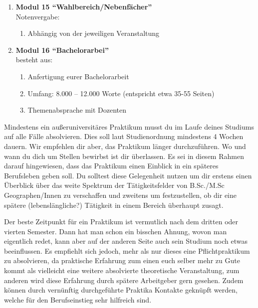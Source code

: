 \begin{enumerate}
 \item \textbf{Modul 15 ``Wahlbereich/Nebenfächer''}  \\
  Notenvergabe:
   \begin{enumerate}
    \item[] Abhängig von der jeweiligen Veranstaltung
   \end{enumerate}
 
 \item \textbf{Modul 16 ``Bachelorarbei''}  \\ besteht aus:
  \begin{enumerate}
   \item Anfertigung eurer Bachelorarbeit 
   \item Umfang: 8.000 – 12.000 Worte (entspricht etwa 35-55 Seiten)
   \item Themenabsprache mit Dozenten
  \end{enumerate}




\end{enumerate}

\newpage

Mindestens ein außeruniversitäres Praktikum musst du im Laufe deines Studiums auf alle Fälle absolvieren. Dies soll laut Studienordnung mindestens 4 Wochen dauern. Wir empfehlen dir aber, das Praktikum länger durchzuführen. Wo und wann du dich um Stellen bewirbst ist dir überlassen. Es sei in diesem Rahmen darauf hingewiesen, dass das Praktikum einen Einblick in ein späteres Berufsleben geben soll. Du solltest diese Gelegenheit nutzen um dir erstens einen Überblick über das weite Spektrum der Tätigkeitsfelder von B.Sc./M.Sc Geographen/Innen zu verschaffen und zweitens um festzustellen, ob dir eine spätere (lebenslängliche?) Tätigkeit in einem Bereich überhaupt zusagt.

Der beste Zeitpunkt für ein Praktikum ist vermutlich nach dem dritten oder vierten Semester. Dann hat man schon ein bisschen Ahnung, wovon man eigentlich redet, kann aber auf der anderen Seite auch sein Studium noch etwas beeinﬂussen. Es empﬁehlt sich jedoch, mehr als nur dieses eine Pﬂichtpraktikum zu absolvieren, da praktische Erfahrung zum einen euch selber mehr zu Gute kommt als vielleicht eine weitere absolvierte theoretische Veranstaltung, zum anderen wird diese Erfahrung durch spätere Arbeitgeber gern gesehen. Zudem können durch vernünftig durchgeführte Praktika Kontakte geknüpft werden, welche für den Berufseinstieg sehr hilfreich sind.

